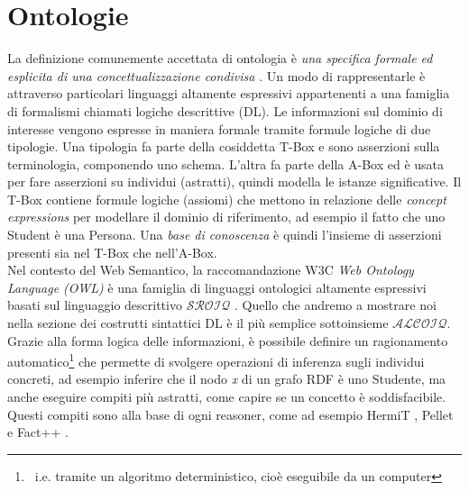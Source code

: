 \section[Ontologie]{Ontologie}
La definizione comunemente accettata di ontologia è \textit{una specifica formale ed esplicita di una concettualizzazione condivisa} \cite{goy2015ontologies}. Un modo di rappresentarle è attraverso particolari linguaggi altamente espressivi appartenenti a una famiglia di formalismi chiamati logiche descrittive (DL). Le informazioni sul dominio di interesse vengono espresse in maniera formale tramite formule logiche di due tipologie. Una tipologia fa parte della cosiddetta T-Box e sono asserzioni sulla terminologia, componendo uno schema. L'altra fa parte della A-Box ed è usata per fare asserzioni su individui (astratti), quindi modella le istanze significative. Il T-Box contiene formule logiche (assiomi) che mettono in relazione delle \textit{concept expressions} per modellare il dominio di riferimento, ad esempio il fatto che  uno Student è una Persona. Una \textit{base di conoscenza} è quindi l'insieme di asserzioni presenti sia nel T-Box che nell'A-Box.\\
Nel contesto del Web Semantico, la raccomandazione W3C \textit{Web Ontology Language (OWL)} è una famiglia di linguaggi ontologici altamente espressivi basati sul linguaggio descrittivo $\mathcal{SROIQ}$ \cite{baader2017introductionDL}. Quello che andremo a mostrare noi nella sezione dei costrutti sintattici DL è il più semplice sottoinsieme $\mathcal{ALCOIQ}$.
Grazie alla forma logica delle informazioni, è possibile definire un ragionamento automatico\footnote{\ i.e. tramite un algoritmo deterministico, cioè eseguibile da un computer} che permette di svolgere operazioni di inferenza sugli individui concreti, ad esempio inferire che il nodo \textit{x} di un grafo RDF è uno Studente, ma anche eseguire compiti più astratti, come capire se un concetto è soddisfacibile. Questi compiti sono alla base di ogni reasoner, come ad esempio HermiT \cite{HermiT}, Pellet \cite{Pellet} e Fact++ \cite{Fact++}.\\

